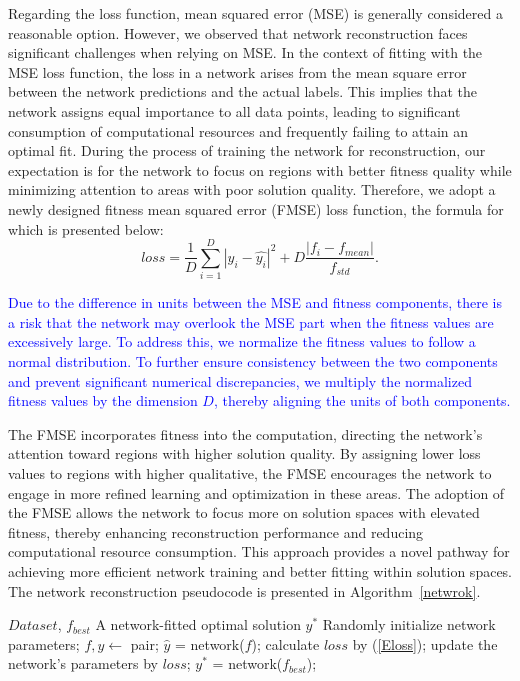 \documentclass[journal,twoside]{IEEEtran}
\begin{document}
Regarding the loss function, mean squared error (MSE) is generally considered a reasonable option. However, we observed that network reconstruction faces significant challenges when relying on MSE. In the context of fitting with the MSE loss function, the loss in a network arises from the mean square error between the network predictions and the actual labels. This implies that the network assigns equal importance to all data points, leading to significant consumption of computational resources and frequently failing to attain an optimal fit. During the process of training the network for reconstruction, our expectation is for the network to focus on regions with better fitness quality while minimizing attention to areas with poor solution quality. Therefore, we adopt a newly designed fitness mean squared error (FMSE) loss function, the formula for which is presented below:
\begin{equation}
	\label{Eloss}
	loss = \frac{1}{D} \sum_{{i} = 1}^{D} \left|y_{i} - \hat{y_{i}}\right|^{2} + 
	{D} \frac{\left|f_{i} - f_{mean}\right|}{f_{std}}.
\end{equation}

\textcolor{blue}{
Due to the difference in units between the MSE and fitness components, there is a risk that the network may overlook the MSE part when the fitness values are excessively large. To address this, we normalize the fitness values to follow a normal distribution. To further ensure consistency between the two components and prevent significant numerical discrepancies, we multiply the normalized fitness values by the dimension $D$, thereby aligning the units of both components.}

The FMSE incorporates fitness into the computation, directing the network's attention toward regions with higher solution quality. By assigning lower loss values to regions with higher qualitative, the FMSE encourages the network to engage in more refined learning and optimization in these areas. The adoption of the FMSE allows the network to focus more on solution spaces with elevated fitness, thereby enhancing reconstruction performance and reducing computational resource consumption. This approach provides a novel pathway for achieving more efficient network training and better fitting within solution spaces. The network reconstruction pseudocode is presented in Algorithm~\ref{netwrok}.
\begin{algorithm}[t]
	\caption{Network Reconstruction} 
	\label{netwrok} 
	\renewcommand{\algorithmicrequire}{\textbf{Input:}}
	\renewcommand{\algorithmicensure}{\textbf{Output:}}
	\begin{algorithmic}[1]
		\REQUIRE $Dataset$, $f_{best}$
		\ENSURE A network-fitted optimal solution $y^{*}$
		\STATE Randomly initialize network parameters;
		\STATE  $f, y \leftarrow $ pair;  
		\STATE $\hat{y}$ = network($f$); 
		\STATE calculate $loss$ by (\ref{Eloss});
		\STATE update the network's parameters by $loss$;
		\ENDFOR
		\ENDFOR
		\STATE $y^{*}$ = network($f_{best}$);
	\end{algorithmic} 
\end{algorithm}
\end{document}
